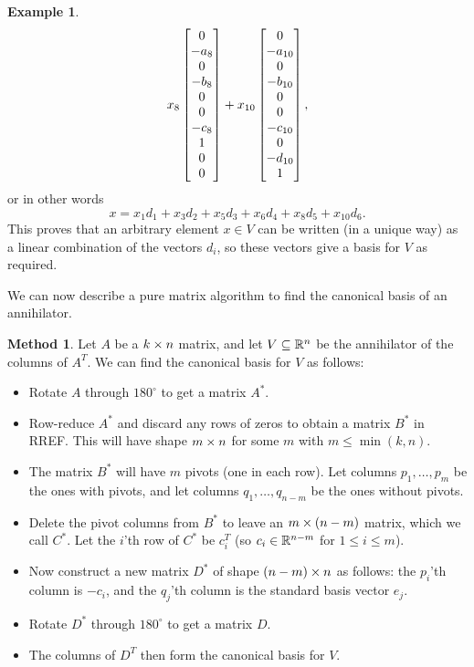 \documentclass[reqno]{amsart}
\theoremstyle{definition}
\newtheorem{example}[theorem]{Example}
\newtheorem{method}[theorem]{Method}
\begin{document}
\begin{example}
\begin{align*}
     x_8 \left[\begin{matrix} 0 \\ -a_8    \\  0  \\ -b_8    \\  0  \\  0  \\ -c_8    \\  1  \\ 0       \\  0  \end{matrix}\right] +
     x_{10} \left[\begin{matrix} 0 \\ -a_{10} \\  0  \\ -b_{10} \\  0  \\  0  \\ -c_{10} \\  0  \\ -d_{10} \\  1  \end{matrix}\right],
 \end{align*}
 or in other words
 \[ x = x_1d_1 + x_3d_2 + x_5d_3 + x_6d_4 + x_8d_5 + x_{10}d_6. \]
 This proves that an arbitrary element $x\in V$ can be written (in
 a unique way) as a linear combination of the vectors $d_i$, so these
 vectors give a basis for $V$ as required.
\end{example}

We can now describe a pure matrix algorithm to find the canonical
basis of an annihilator.

\begin{method}\label{meth-ann-basis-matrix}
 Let $A$ be a $k\times n$ matrix, and let $V\subseteq{\mathbb{R}}^n$ be the annihilator
 of the columns of $A^T$.  We can find the canonical basis for $V$ as
 follows:
 \begin{itemize}
  \item[(a)] Rotate $A$ through $180^\circ$ to get a matrix $A^*$.
  \item[(b)] Row-reduce $A^*$ and discard any rows of zeros to obtain
   a matrix $B^*$ in RREF.  This will have shape $m\times n$ for some
   $m$ with $m\leq\min(k,n)$.
  \item[(c)] The matrix $B^*$ will have $m$ pivots (one in each row).
   Let columns $p_1,\dotsc,p_m$ be the ones with pivots, and let
   columns $q_1,\dotsc,q_{n-m}$ be the ones without pivots.
  \item[(d)] Delete the pivot columns from $B^*$ to leave an $m\times(n-m)$
   matrix, which we call $C^*$.  Let the $i$'th row of $C^*$ be $c_i^T$
   (so $c_i\in{\mathbb{R}}^{n-m}$ for $1\leq i\leq m$).
  \item[(e)] Now construct a new matrix $D^*$ of shape $(n-m)\times n$ as
   follows: the $p_i$'th column is $-c_i$, and the $q_j$'th column is
   the standard basis vector $e_j$.
  \item[(f)] Rotate $D^*$ through $180^\circ$ to get a matrix $D$.
  \item[(g)] The columns of $D^T$ then form the canonical basis for $V$.
 \end{itemize}
\end{method}
\end{document}
